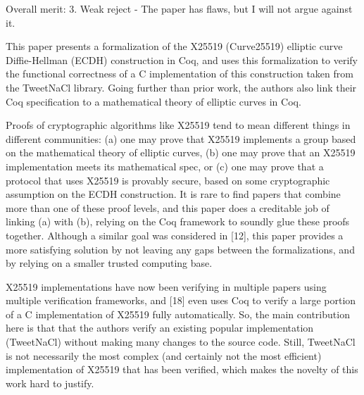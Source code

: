 Overall merit: 3. Weak reject - The paper has flaws, but I will not argue against it.


\begin{center}
\end{center}

This paper presents a formalization of the X25519 (Curve25519) elliptic curve
Diffie-Hellman  (ECDH) construction in Coq, and uses this formalization to
verify the functional correctness of a C implementation of this construction
taken from the TweetNaCl library. Going further than prior work, the authors
also link their Coq specification to a mathematical theory of elliptic curves
in Coq.


\begin{center}
\end{center}

Proofs of cryptographic algorithms like X25519 tend to mean different things in
different communities: (a) one may prove that X25519 implements a group based on
the mathematical theory of elliptic curves, (b) one may prove that an X25519
implementation meets its mathematical spec, or (c) one may prove that a protocol
that uses X25519 is provably secure, based on some cryptographic assumption on
the ECDH construction. It is rare to find papers that combine more than one of
these proof levels, and this paper does a creditable job of linking (a) with (b),
relying on the Coq framework to soundly glue these proofs together. Although a
similar goal was considered in [12], this paper provides a more satisfying
solution by not leaving any gaps between the formalizations, and by relying on a
smaller trusted computing base.


\begin{center}
\end{center}

X25519 implementations have now been verifying in multiple papers using multiple
verification frameworks, and [18] even uses Coq to verify a large portion of a C
implementation of X25519 fully automatically. So, the main contribution here is
that that the authors verify an existing popular implementation (TweetNaCl)
without making many changes to the source code. Still, TweetNaCl is not necessarily
the most complex (and certainly not the most efficient) implementation of X25519
that has been verified, which makes the novelty of this work hard to justify.


